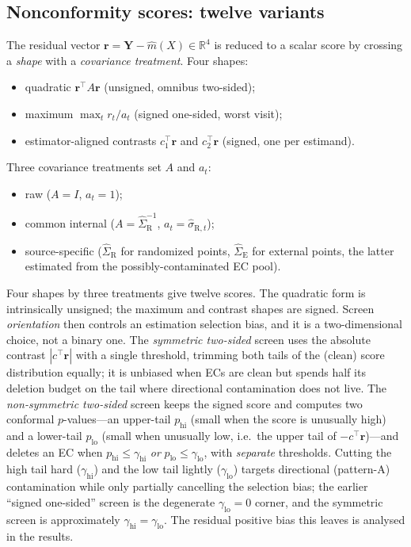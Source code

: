 \documentclass[11pt]{article}
\newcommand{\R}{\mathrm{R}}
\newcommand{\E}{\mathrm{E}}
\begin{document}
\subsection{Nonconformity scores: twelve variants}

The residual vector $\bm r=\bm Y-\widehat m(X)\in\mathbb R^4$ is reduced to a scalar score by crossing a \emph{shape} with a \emph{covariance treatment}. Four shapes:
\begin{itemize}
    \item quadratic $\bm r^{\top}A\bm r$ (unsigned, omnibus two-sided);
    \item maximum $\max_t r_t/a_t$ (signed one-sided, worst visit);
    \item estimator-aligned contrasts $c_1^{\top}\bm r$ and $c_2^{\top}\bm r$ (signed, one per estimand).
\end{itemize}
Three covariance treatments set $A$ and $a_t$:
\begin{itemize}
    \item raw ($A=I$, $a_t=1$);
    \item common internal ($A=\widehat\Sigma_{\R}^{-1}$, $a_t=\widehat\sigma_{\R,t}$);
    \item source-specific ($\widehat\Sigma_{\R}$ for randomized points, $\widehat\Sigma_{\E}$ for external points, the latter estimated from the possibly-contaminated EC pool).
\end{itemize}
Four shapes by three treatments give twelve scores. The quadratic form is intrinsically unsigned; the maximum and contrast shapes are signed. Screen \emph{orientation} then controls an estimation selection bias, and it is a two-dimensional choice, not a binary one. The \emph{symmetric two-sided} screen uses the absolute contrast $|c^{\top}\bm r|$ with a single threshold, trimming both tails of the (clean) score distribution equally; it is unbiased when ECs are clean but spends half its deletion budget on the tail where directional contamination does not live. The \emph{non-symmetric two-sided} screen keeps the signed score and computes two conformal $p$-values---an upper-tail $p_{\mathrm{hi}}$ (small when the score is unusually high) and a lower-tail $p_{\mathrm{lo}}$ (small when unusually low, i.e.\ the upper tail of $-c^{\top}\bm r$)---and deletes an EC when $p_{\mathrm{hi}}\le\gamma_{\mathrm{hi}}$ \emph{or} $p_{\mathrm{lo}}\le\gamma_{\mathrm{lo}}$, with \emph{separate} thresholds. Cutting the high tail hard ($\gamma_{\mathrm{hi}}$) and the low tail lightly ($\gamma_{\mathrm{lo}}$) targets directional (pattern-A) contamination while only partially cancelling the selection bias; the earlier ``signed one-sided'' screen is the degenerate $\gamma_{\mathrm{lo}}{=}0$ corner, and the symmetric screen is approximately $\gamma_{\mathrm{hi}}{=}\gamma_{\mathrm{lo}}$. The residual positive bias this leaves is analysed in the results.
\end{document}
